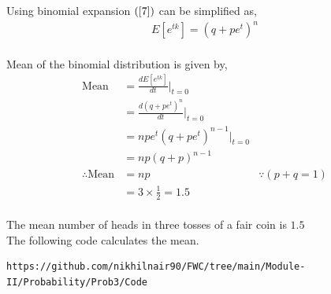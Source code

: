 \documentclass[journal,12pt,twocolumn]{IEEEtran}
\begin{document}
Using binomial expansion $(\ref{7})$ can be simplified as,
\begin{align}
E[e^{tk}]= (q + pe^t)^n
\end{align}
\\

Mean of the binomial distribution is given by,
\begin{align}
\text{Mean}&= \frac{dE[e^{tk}]}{dt}|_{t=0}&
\\
&= \frac{d(q + pe^t)^n}{dt}|_{t=0}&
\\
&=npe^t(q + pe^t)^{n-1}|_{t=0}&
\\
&= np(q + p)^{n-1}&
\\
\therefore \text{Mean} &= np& {}\because(p+q=1)
\\
&= 3\times\frac{1}{2}= 1.5&
\end{align}
\\

The mean number of heads in three tosses of a fair coin is $1.5$
\\

The following code calculates the mean.
\begin{lstlisting}
https://github.com/nikhilnair90/FWC/tree/main/Module-II/Probability/Prob3/Code
\end{lstlisting}
\end{document}
